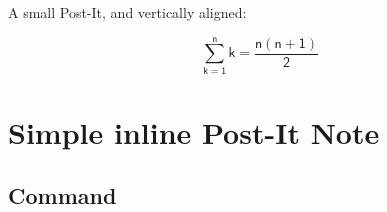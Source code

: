 \documentclass[english,a4paper,11pt]{article}
\begin{document}
\begin{DemoCode}[]
\begin{wrapstuff}[r,top=1]
\begin{PostItNote}[Rotate=5,Corner,Color=pink,PinkColor=blue,Border=false]
\lipsum[1][1-2]
\end{PostItNote}
\end{wrapstuff}

\lipsum[1]
\end{DemoCode}

\begin{DemoCode}[]
\begin{wrapstuff}[r,top=1]
\begin{PostItNote}[Rotate=5,Render=tikz,Color=pink, PinkColor=blue,Border=false]
\lipsum[1][1-2]
\end{PostItNote}
\end{wrapstuff}

\lipsum[1]
\end{DemoCode}

\begin{DemoCode}[]
\begin{wrapstuff}[r,top=1]
\begin{PostItNote}[Rotate=5,Render=tikzv2,Pin=Scotch,Color=pink]
\lipsum[1][1-2]
\end{PostItNote}
\end{wrapstuff}

\lipsum[1]
\end{DemoCode}

\begin{DemoCode}[]
A small Post-It, and vertically aligned:
%
\hfill\begin{PostItNote}[Rotate=-10,Color=orange,Width=5cm,Height=5cm, AlignV=center,Corner,PinColor=yellow, PinShift=-1,AlignPostIt=center]

\textsf{\small\lipsum[1][1-2]}
\[\mathsf{\displaystyle\sum_{k=1}^{n} k = \dfrac{n(n+1)}{2}}\]
\end{PostItNote}
\end{DemoCode}

\pagebreak

\section{Simple inline Post-It Note}

\subsection{Command}
\end{document}
